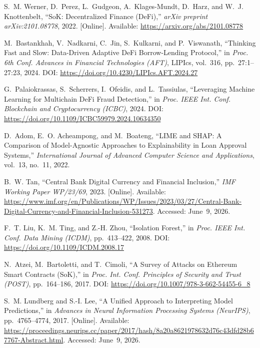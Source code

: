 \documentclass[12pt,a4paper]{report}
\begin{document}
{\small
\begin{enumerate}[label={[\arabic*]}]
\item S.~M. Werner, D.~Perez, L.~Gudgeon, A.~Klages-Mundt, D.~Harz, and W.~J. Knottenbelt, ``SoK: Decentralized Finance (DeFi),'' \textit{arXiv preprint arXiv:2101.08778}, 2022. [Online]. Available: \url{https://arxiv.org/abs/2101.08778}

\item M.~Bastankhah, V.~Nadkarni, C.~Jin, S.~Kulkarni, and P.~Viswanath, ``Thinking Fast and Slow: Data-Driven Adaptive DeFi Borrow-Lending Protocol,'' in \textit{Proc. 6th Conf. Advances in Financial Technologies (AFT)}, LIPIcs, vol.~316, pp.~27:1--27:23, 2024. DOI: \url{https://doi.org/10.4230/LIPIcs.AFT.2024.27}
\item G.~Palaiokrassas, S.~Scherrers, I.~Ofeidis, and L.~Tassiulas, ``Leveraging Machine Learning for Multichain DeFi Fraud Detection,'' in \textit{Proc. IEEE Int. Conf. Blockchain and Cryptocurrency (ICBC)}, 2024. DOI: \url{https://doi.org/10.1109/ICBC59979.2024.10634350}
\item D.~Adom, E.~O. Acheampong, and M.~Boateng, ``LIME and SHAP: A Comparison of Model-Agnostic Approaches to Explainability in Loan Approval Systems,'' \textit{International Journal of Advanced Computer Science and Applications}, vol.~13, no.~11, 2022.

\item B.~W. Tan, ``Central Bank Digital Currency and Financial Inclusion,'' \textit{IMF Working Paper WP/23/69}, 2023. [Online]. Available: \url{https://www.imf.org/en/Publications/WP/Issues/2023/03/27/Central-Bank-Digital-Currency-and-Financial-Inclusion-531273}. Accessed: June~9, 2026.
\item F.~T. Liu, K.~M. Ting, and Z.-H. Zhou, ``Isolation Forest,'' in \textit{Proc. IEEE Int. Conf. Data Mining (ICDM)}, pp.~413--422, 2008. DOI: \url{https://doi.org/10.1109/ICDM.2008.17}

\item N.~Atzei, M.~Bartoletti, and T.~Cimoli, ``A Survey of Attacks on Ethereum Smart Contracts (SoK),'' in \textit{Proc. Int. Conf. Principles of Security and Trust (POST)}, pp.~164--186, 2017. DOI: \url{https://doi.org/10.1007/978-3-662-54455-6_8}

\item S.~M. Lundberg and S.-I. Lee, ``A Unified Approach to Interpreting Model Predictions,'' in \textit{Advances in Neural Information Processing Systems (NeurIPS)}, pp.~4765--4774, 2017. [Online]. Available: \url{https://proceedings.neurips.cc/paper/2017/hash/8a20a8621978632d76c43dfd28b67767-Abstract.html}. Accessed: June~9, 2026.


\end{enumerate}}
\end{document}
